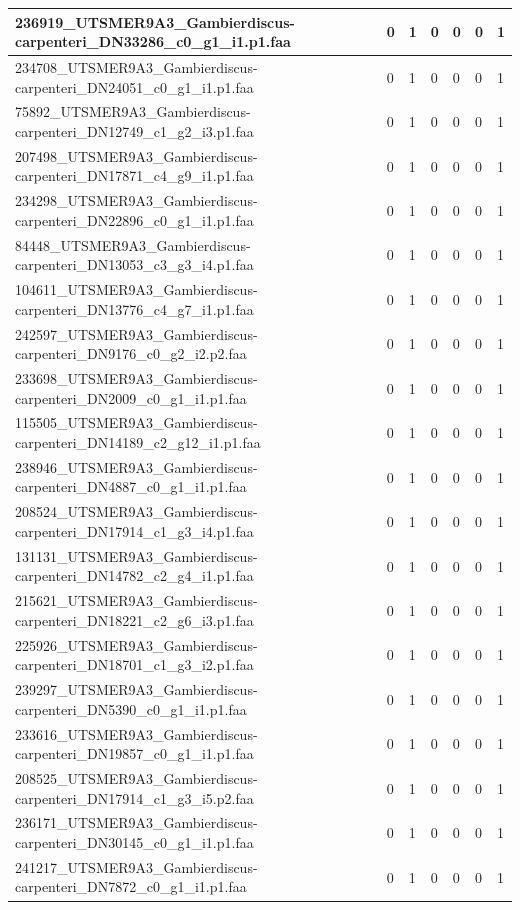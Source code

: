\documentclass[12pt]{article}
\begin{document}
\begin{longtable}{ | p{2cm} | p{2cm} |p{2.5cm} | p{2cm} | p{2.5cm} |  p{2cm} | p{2cm} |}
 \hline 
236919\_UTSMER9A3\_Gambierdiscus-carpenteri\_DN33286\_c0\_g1\_i1.p1.faa&0&1&0&0&0&1\\ 
 \hline 
234708\_UTSMER9A3\_Gambierdiscus-carpenteri\_DN24051\_c0\_g1\_i1.p1.faa&0&1&0&0&0&1\\ 
 \hline 
75892\_UTSMER9A3\_Gambierdiscus-carpenteri\_DN12749\_c1\_g2\_i3.p1.faa&0&1&0&0&0&1\\ 
 \hline 
207498\_UTSMER9A3\_Gambierdiscus-carpenteri\_DN17871\_c4\_g9\_i1.p1.faa&0&1&0&0&0&1\\ 
 \hline 
234298\_UTSMER9A3\_Gambierdiscus-carpenteri\_DN22896\_c0\_g1\_i1.p1.faa&0&1&0&0&0&1\\ 
 \hline 
84448\_UTSMER9A3\_Gambierdiscus-carpenteri\_DN13053\_c3\_g3\_i4.p1.faa&0&1&0&0&0&1\\ 
 \hline 
104611\_UTSMER9A3\_Gambierdiscus-carpenteri\_DN13776\_c4\_g7\_i1.p1.faa&0&1&0&0&0&1\\ 
 \hline 
242597\_UTSMER9A3\_Gambierdiscus-carpenteri\_DN9176\_c0\_g2\_i2.p2.faa&0&1&0&0&0&1\\ 
 \hline 
233698\_UTSMER9A3\_Gambierdiscus-carpenteri\_DN2009\_c0\_g1\_i1.p1.faa&0&1&0&0&0&1\\ 
 \hline 
115505\_UTSMER9A3\_Gambierdiscus-carpenteri\_DN14189\_c2\_g12\_i1.p1.faa&0&1&0&0&0&1\\ 
 \hline 
238946\_UTSMER9A3\_Gambierdiscus-carpenteri\_DN4887\_c0\_g1\_i1.p1.faa&0&1&0&0&0&1\\ 
 \hline 
208524\_UTSMER9A3\_Gambierdiscus-carpenteri\_DN17914\_c1\_g3\_i4.p1.faa&0&1&0&0&0&1\\ 
 \hline 
131131\_UTSMER9A3\_Gambierdiscus-carpenteri\_DN14782\_c2\_g4\_i1.p1.faa&0&1&0&0&0&1\\ 
 \hline 
215621\_UTSMER9A3\_Gambierdiscus-carpenteri\_DN18221\_c2\_g6\_i3.p1.faa&0&1&0&0&0&1\\ 
 \hline 
225926\_UTSMER9A3\_Gambierdiscus-carpenteri\_DN18701\_c1\_g3\_i2.p1.faa&0&1&0&0&0&1\\ 
 \hline 
239297\_UTSMER9A3\_Gambierdiscus-carpenteri\_DN5390\_c0\_g1\_i1.p1.faa&0&1&0&0&0&1\\ 
 \hline 
233616\_UTSMER9A3\_Gambierdiscus-carpenteri\_DN19857\_c0\_g1\_i1.p1.faa&0&1&0&0&0&1\\ 
 \hline 
208525\_UTSMER9A3\_Gambierdiscus-carpenteri\_DN17914\_c1\_g3\_i5.p2.faa&0&1&0&0&0&1\\ 
 \hline 
236171\_UTSMER9A3\_Gambierdiscus-carpenteri\_DN30145\_c0\_g1\_i1.p1.faa&0&1&0&0&0&1\\ 
 \hline 
241217\_UTSMER9A3\_Gambierdiscus-carpenteri\_DN7872\_c0\_g1\_i1.p1.faa&0&1&0&0&0&1\\ 

\end{longtable}
\end{document}
